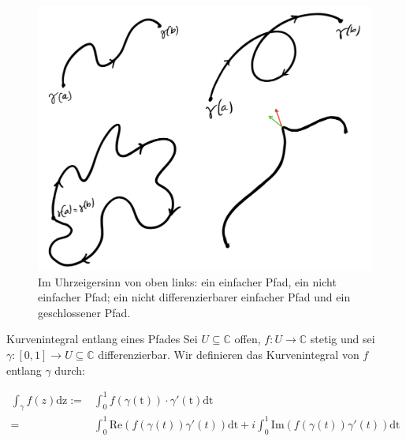 \documentclass[a4paper,10pt]{article}
\def\Re{\text{Re}}
\def\Im{\text{Im}}
\begin{document}
\begin{figure}[H]
  \centering 
  \includegraphics[width=0.9\linewidth]{assets/paths.png}
  \caption{Im Uhrzeigersinn von oben links: ein einfacher Pfad, ein nicht einfacher Pfad; ein nicht differenzierbarer einfacher Pfad und ein geschlossener Pfad.}
\end{figure}

\begin{mainbox}{Kurvenintegral entlang eines Pfades}
  Sei \(U \subseteq \mathbb{C}\) offen, \(f \colon U \to \mathbb{C}\) stetig und sei \(\gamma \colon [0,1] \to U \subseteq \mathbb{C}\) differenzierbar. Wir definieren das Kurvenintegral von \(f\) entlang \(\gamma\) durch:
  
  \begin{align*} 
  \int_{\gamma} f(z) \text{dz} :=& \int_0^1 f(\gamma(\text{t}))\cdot \gamma'(\text{t}) \text{dt}\\
   = &\int_0^1 \Re(f(\gamma (t))  \gamma'(t) )\text{dt} + i \int_0^1 \Im(f(\gamma (t))  \gamma'(t)) \text{dt}
  \end{align*}
\end{mainbox}
\end{document}
